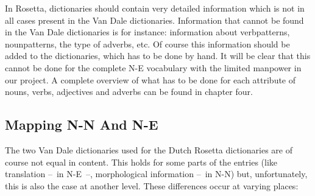 In Rosetta, dictionaries should contain very detailed information which is not
in all cases present in the Van Dale dictionaries. Information that cannot be 
found in the Van Dale dictionaries is for instance: 
information about verbpatterns, nounpatterns, the type of adverbs, etc.
Of course this information should be added to the dictionaries, which has to
be done by hand. It will be clear that this cannot be done for the complete
N-E vocabulary with the limited manpower in our project.
A complete overview of what has to be done for each attribute of nouns, 
verbs, adjectives and adverbs can be found in chapter four.
 
\subsection{Mapping N-N And N-E}
The two Van Dale dictionaries used for the Dutch Rosetta dictionaries are 
of course not
equal in content. This holds for some parts of the entries (like
translation --~in N-E~--, morphological information --~in N-N) but, 
unfortunately, 
this is also the case at another level. These differences occur at varying 
places:
 
